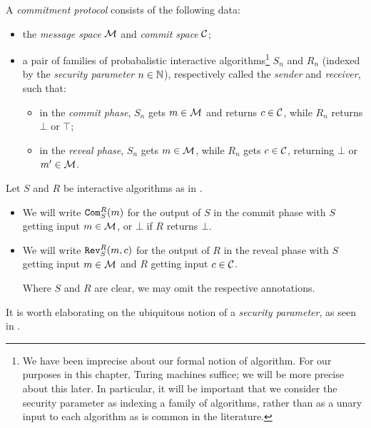 \begin{dfn}\label{def:commitment protocol}
	A \emph{commitment protocol} consists of the following data:
	\begin{itemize}
		\item the \emph{message space} $\mathcal{M}$ and \emph{commit space} $\mathcal{C}$;
		\item a pair of families of probabalistic interactive algorithms\footnote{We
			      have been imprecise about our formal notion of algorithm. For our
			      purposes in this chapter, Turing machines suffice; we will be more
			      precise about this later. In particular, it will be important that we
			      consider the security parameter as indexing a family of algorithms, rather
			      than as a unary input to each algorithm as is common in the literature.}
		      $S_n$ and $R_n$ (indexed by the
		      \emph{security parameter} $n\in\mathbb{N}$), respectively called the \emph{sender}
		      and \emph{receiver}, such that:
		      \begin{itemize}
			      \item in the \emph{commit phase}, $S_n$ gets $m\in\mathcal{M}$ and returns
			            $c\in\mathcal{C}$, while $R_n$ returns $\bot$ or $\top$;
			      \item in the \emph{reveal phase}, $S_n$ gets $m\in\mathcal{M}$, while $R_n$
			            gets $c\in\mathcal{C}$, returning $\bot$ or $m'\in\mathcal{M}$.
		      \end{itemize}
	\end{itemize}
\end{dfn}

\begin{ntn}
	Let $S$ and $R$ be interactive algorithms as in .
  \begin{itemize}
		\item	We will write ${\texttt{Com}}_S^R(m)$ for the output of $S$
		      in the commit phase with $S$ getting input $m\in\mathcal{M}$, or $\bot$ if $R$
		      returns $\bot$.
		\item We will write ${\texttt{Rev}}_S^R(m, c)$
		      for the output of $R$ in the reveal phase with $S$ getting input
		      $m\in\mathcal{M}$ and $R$ getting input $c\in\mathcal{C}$.

		      Where $S$ and $R$ are clear, we may omit the respective annotations.
	\end{itemize}
\end{ntn}

\noindent
It is worth elaborating on the ubiquitous notion of a \emph{security parameter}, as
seen in .

